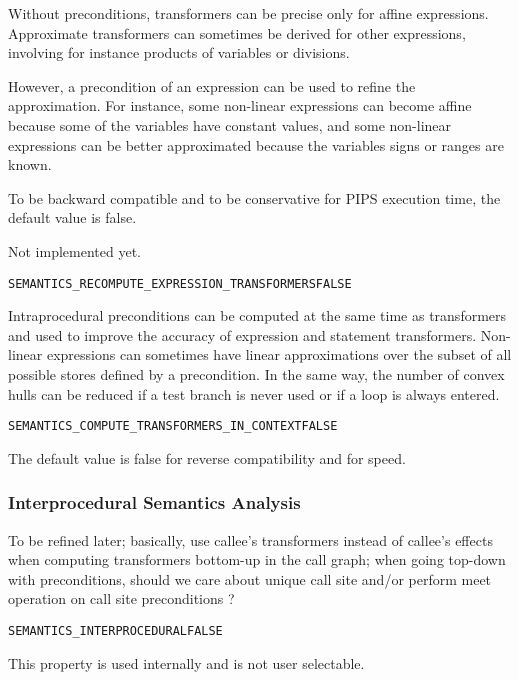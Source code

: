 \documentclass[a4paper]{report}
\newenvironment{PipsProp}{\begin{alltt}}{\end{alltt}}
\begin{document}
Without preconditions, transformers can be precise only for affine
expressions. Approximate transformers can sometimes be derived for other
expressions, involving for instance products of variables or divisions.

However, a precondition of an expression can be used to refine the
approximation. For instance, some non-linear expressions can become affine
because some of the variables have constant values, and some non-linear
expressions can be better approximated because the variables signs or
ranges are known.

To be backward compatible and to be conservative for PIPS execution time,
the default value is false.

Not implemented yet.

\begin{PipsProp}
SEMANTICS_RECOMPUTE_EXPRESSION_TRANSFORMERS FALSE
\end{PipsProp}

Intraprocedural preconditions can be computed at the same time as
transformers and used to improve the accuracy of expression and statement
transformers. Non-linear expressions can sometimes have linear
approximations over the subset of all possible stores defined by a
precondition. In the same way, the number of convex hulls can be reduced
if a test branch is never used or if a loop is always entered.

\begin{PipsProp}
SEMANTICS_COMPUTE_TRANSFORMERS_IN_CONTEXT FALSE
\end{PipsProp}

The default value is false for reverse compatibility and for speed.

\subsubsection{Interprocedural Semantics Analysis}

To be refined later; basically, use callee's transformers instead of
callee's effects when computing transformers bottom-up in the call graph;
when going top-down with preconditions, should we care about unique
call site and/or perform meet operation on call site preconditions ?

\begin{PipsProp}
SEMANTICS_INTERPROCEDURAL FALSE
\end{PipsProp}

This property is used internally and is not user selectable.
\end{document}
